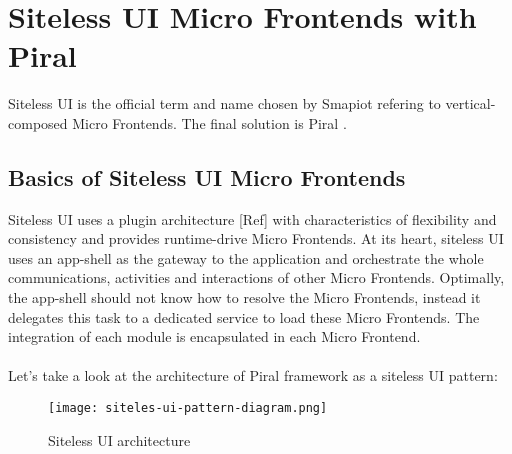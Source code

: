 \documentclass[a4paper]{book}
\begin{document}

\chapter{Siteless UI Micro Frontends with Piral}
Siteless UI is the official term and name chosen by Smapiot \cite{Piral} refering to vertical-composed Micro Frontends. The final solution is Piral \cite{Piral}.
\section{Basics of Siteless UI Micro Frontends }
Siteless UI uses a plugin architecture [Ref] with characteristics of flexibility and consistency and provides runtime-drive Micro Frontends. At its heart, siteless UI uses an app-shell as the gateway to the application and orchestrate the whole communications, activities and interactions of other Micro Frontends. Optimally, the app-shell should not know how to resolve the Micro Frontends, instead it delegates this task to a dedicated service to load these Micro Frontends. The integration of each module is encapsulated in each Micro Frontend. 
\\ \\ 
Let’s take a look at the architecture of Piral framework as a siteless UI pattern:
\begin{figure}[h!]
    \centering
    \captionsetup{justification=centering}
    \texttt{[image: siteles-ui-pattern-diagram.png]}
    \caption{Siteless UI architecture}
    \label{fig:6}
\end{figure}
\end{document}

